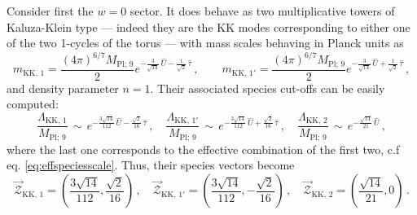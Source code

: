 Consider first the $w=0$ sector. It does behave as two multiplicative towers of Kaluza-Klein type --- indeed they are the KK modes corresponding to either one of the two 1-cycles of the torus --- with mass scales behaving in Planck units as
%
\begin{equation} \label{KK-mass}
  m_{\text{KK},\, 1} = \frac{(4\pi)^{6/7} M_{\text{Pl};\, 9}}{2} e^{-\frac{3}{\sqrt{14}} \, \hat U - \frac{1}{\sqrt{2}} \,\hat\tau } \, , \qquad 
  m_{\text{KK},\, 1'} = \frac{(4\pi)^{6/7} M_{\text{Pl};\, 9}}{2}  e^{-\frac{3}{\sqrt{14}} \, \hat U + \frac{1}{\sqrt{2}} \,\hat\tau } \, ,
\end{equation}
%
and density parameter $n=1$. Their associated species cut-offs can be easily computed:
%
\begin{equation}
  \frac{\Lambda_{\text{KK},\, 1}}{M_{\text{Pl};\, 9}}\, \sim\, e^{-\frac{3\sqrt{14}}{112} \, \hat U - \frac{\sqrt{2}}{16} \,\hat\tau } \, , \quad 
  \frac{\Lambda_{\text{KK},\, 1'}}{M_{\text{Pl};\, 9}}\, \sim\, e^{-\frac{3\sqrt{14}}{112} \, \hat U + \frac{\sqrt{2}}{16} \,\hat\tau } \, , \quad
   \frac{\Lambda_{\text{KK},\, 2}}{M_{\text{Pl};\, 9}}\, \sim\, e^{-\frac{\sqrt{14}}{21} \, \hat U} \, ,
\end{equation}
%
where the last one corresponds to the effective combination of the first two, c.f eq. \eqref{eq:effspeciesscale}. Thus, their species vectors become
%
\begin{equation}
  \vec{\mathcal{Z}}_{\text{KK},\, 1} = \left( \frac{3\sqrt{14}}{112},\frac{\sqrt{2}}{16} \right)\, , \quad
  \vec{\mathcal{Z}}_{\text{KK},\, 1'} = \left( \frac{3\sqrt{14}}{112},-\frac{\sqrt{2}}{16}\right) \, , \quad
  \vec{\mathcal{Z}}_{\text{KK},\, 2} = \left( \frac{\sqrt{14}}{21}  , 0\right) \, .
\end{equation}
%

